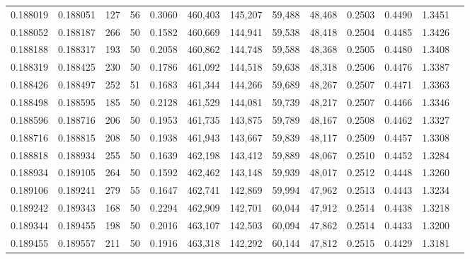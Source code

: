 \begin{tabular}{rrrrrrrrrrrrr}
0.188019 & 0.188051 &   127 &  56 &                                     0.3060 & 460,403 & 145,207 &  59,488 &  48,468 & 0.2503 & 0.4490 & 1.3451 \\
0.188052 & 0.188187 &   266 &  50 &                                     0.1582 & 460,669 & 144,941 &  59,538 &  48,418 & 0.2504 & 0.4485 & 1.3426 \\
0.188188 & 0.188317 &   193 &  50 &                                     0.2058 & 460,862 & 144,748 &  59,588 &  48,368 & 0.2505 & 0.4480 & 1.3408 \\
0.188319 & 0.188425 &   230 &  50 &                                     0.1786 & 461,092 & 144,518 &  59,638 &  48,318 & 0.2506 & 0.4476 & 1.3387 \\
0.188426 & 0.188497 &   252 &  51 &                                     0.1683 & 461,344 & 144,266 &  59,689 &  48,267 & 0.2507 & 0.4471 & 1.3363 \\
0.188498 & 0.188595 &   185 &  50 &                                     0.2128 & 461,529 & 144,081 &  59,739 &  48,217 & 0.2507 & 0.4466 & 1.3346 \\
0.188596 & 0.188716 &   206 &  50 &                                     0.1953 & 461,735 & 143,875 &  59,789 &  48,167 & 0.2508 & 0.4462 & 1.3327 \\
0.188716 & 0.188815 &   208 &  50 &                                     0.1938 & 461,943 & 143,667 &  59,839 &  48,117 & 0.2509 & 0.4457 & 1.3308 \\
0.188818 & 0.188934 &   255 &  50 &                                     0.1639 & 462,198 & 143,412 &  59,889 &  48,067 & 0.2510 & 0.4452 & 1.3284 \\
0.188934 & 0.189105 &   264 &  50 &                                     0.1592 & 462,462 & 143,148 &  59,939 &  48,017 & 0.2512 & 0.4448 & 1.3260 \\
0.189106 & 0.189241 &   279 &  55 &                                     0.1647 & 462,741 & 142,869 &  59,994 &  47,962 & 0.2513 & 0.4443 & 1.3234 \\
0.189242 & 0.189343 &   168 &  50 &                                     0.2294 & 462,909 & 142,701 &  60,044 &  47,912 & 0.2514 & 0.4438 & 1.3218 \\
0.189344 & 0.189455 &   198 &  50 &                                     0.2016 & 463,107 & 142,503 &  60,094 &  47,862 & 0.2514 & 0.4433 & 1.3200 \\
0.189455 & 0.189557 &   211 &  50 &                                     0.1916 & 463,318 & 142,292 &  60,144 &  47,812 & 0.2515 & 0.4429 & 1.3181 \\

\end{tabular}
